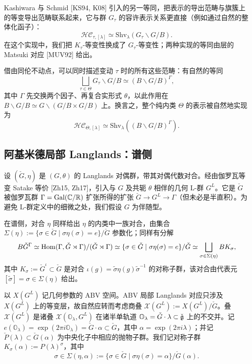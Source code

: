 Kashiwara 与 Schmid [KS94, K08] 引入的另一等同，把表示的导出范畴与旗簇上的等变导出范畴联系起来，它与群 $G_\tau$ 的容许表示关系更直接（例如通过自然的整体化函子）：
\[
\mathcal{HC}_{\tau,[\lambda]}\simeq \mathrm{Shv}_\lambda(G_\tau\backslash G/B).
\]
在这个实现中，我们把 $K_\tau$-等变性换成了 $G_\tau$-等变性；两种实现的等同由层的 Matsuki 对应 [MUV92] 给出。

借由同伦不动点，可以同时描述变动 $\tau$ 时的所有这些范畴：有自然的等同
\[
\bigsqcup_{\tau\in\Theta}G_\tau\backslash G/B\simeq (B\backslash G/B)^\Gamma,
\]
其中 $\Gamma$ 先交换两个因子、再复合实形式 $\theta$，以此作用在 $B\backslash G/B\simeq G\backslash(G/B\times G/B)$ 上。换言之，整个纯内类 $\Theta$ 的表示被自然地实现为
\[
\mathcal{HC}_{\Theta,[\lambda]}\simeq\mathrm{Shv}_\lambda((B\backslash G/B)^\Gamma).
\]

\subsection{阿基米德局部 Langlands：谱侧}

设 $(\check G,\eta)$ 是 $(G,\theta)$ 的 Langlands 对偶群，带其对偶代数对合。经由伽罗瓦等变 Satake 等价 [Zh15, Zh17]，引入与 $G$ 及共轭 $\theta$ 相伴的几何 L-群 $G^L$。它是 $\check G$ 被伽罗瓦群 $\Gamma=\operatorname{Gal}(\mathbb{C}/\mathbb{R})$ 扩张所得的扩张 $\check G\to G^L\to\Gamma$（但未必是半直积）。为避免 L-群定义中的细微之处，我们假设 $G$ 为伴随型。

在谱侧，对合 $\eta$ 同样给出 $\eta$ 的内类中一族对合，由集合 $\Sigma(\eta):=\{\sigma\in\check G\mid\sigma\eta(\sigma)=e\}/\check G$ 参数化；同样有分解
\[
B\check G^\Gamma\simeq\operatorname{Hom}(\Gamma,\check G\rtimes\Gamma)/(\check G\rtimes\Gamma)\simeq\{\sigma\in\check G\mid \sigma\eta(\sigma)=e\}/\check G\simeq\bigsqcup_{\sigma\in\Sigma(\eta)}BK_\sigma,
\]
其中 $K_\sigma:=\check G^\iota\subset\check G$ 是对合 $\iota(g)=\tilde\sigma\eta(g)\tilde\sigma^{-1}$ 的对称子群，该对合由代表元 $[\tilde\sigma]=\sigma\in\Sigma(\eta)$ 给出。

以 $X(G^L)$ 记几何参数的 ABV 空间。ABV 局部 Langlands 对应只涉及 $X(G^L)$ 上的等变层，故自然应转而考虑商叠 $\mathcal X(G^L):=X(G^L)/\check G$。叠 $\mathcal X(G^L)$ 是诸叠 $\mathcal X(\mathbb O_\lambda,G^L)$ 在诸半单轨道 $\mathbb O_\lambda=\check G\cdot\lambda\subset\check{\mathfrak{g}}$ 上的不交并。记 $e(\mathbb O_\lambda)=\exp(2\pi i\mathbb O_\lambda)=\check G\cdot\alpha\subset\check G$，其中 $\alpha=\exp(2\pi i\lambda)$；并记 $\check P(\lambda)\subset\check G(\alpha)$ 为中央化子中相应的抛物子群。我们记对称子群 $K_\sigma(\alpha):=P(\lambda)^\sigma$，其中
\begin{equation}\tag{4.1}\label{eq:a5-03-4-1}
\sigma\in\Sigma(\eta,\alpha):=\{\sigma\in\check G\mid\sigma\eta(\sigma)=\alpha\}/\check G(\alpha).
\end{equation}

